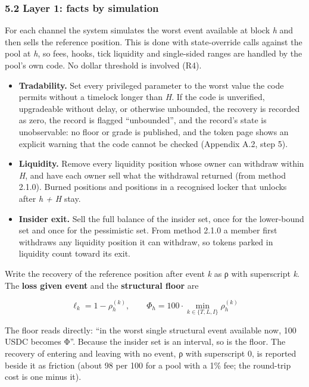 \subsubsection{5.2 Layer 1: facts by simulation}\label{layer-1-facts-by-simulation}

For each channel the system simulates the worst event available at block \emph{h} and then sells the reference position. This is done with state-override calls against the pool at \emph{h}, so fees, hooks, tick liquidity and single-sided ranges are handled by the pool's own code. No dollar threshold is involved (R4).

\begin{itemize}
\tightlist
\item
  \textbf{Tradability.} Set every privileged parameter to the worst value the code permits without a timelock longer than \emph{H}. If the code is unverified, upgradeable without delay, or otherwise unbounded, the recovery is recorded as zero, the record is flagged ``unbounded'', and the record's state is unobservable: no floor or grade is published, and the token page shows an explicit warning that the code cannot be checked (Appendix A.2, step 5).
\item
  \textbf{Liquidity.} Remove every liquidity position whose owner can withdraw within \emph{H}, and have each owner sell what the withdrawal returned (from method 2.1.0). Burned positions and positions in a recognised locker that unlocks after \emph{h + H} stay.
\item
  \textbf{Insider exit.} Sell the full balance of the insider set, once for the lower-bound set and once for the pessimistic set. From method 2.1.0 a member first withdraws any liquidity position it can withdraw, so tokens parked in liquidity count toward its exit.
\end{itemize}

Write the recovery of the reference position after event \emph{k} as ρ with superscript \emph{k}. The \textbf{loss given event} and the \textbf{structural floor} are

\[
\ell_k = 1 - \rho_h^{(k)}, \qquad \Phi_h = 100 \cdot \min_{k \in \{T, L, I\}} \rho_h^{(k)}
\]

The floor reads directly: ``in the worst single structural event available now, 100 USDC becomes Φ''. Because the insider set is an interval, so is the floor. The recovery of entering and leaving with no event, ρ with superscript 0, is reported beside it as friction (about 98 per 100 for a pool with a 1\% fee; the round-trip cost is one minus it).

